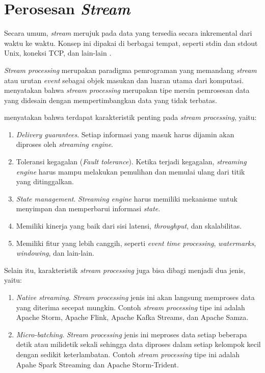 \section{Perosesan \textit{Stream}}

Secara umum, \textit{stream} merujuk pada data yang tersedia secara inkremental dari waktu ke waktu. Konsep ini dipakai di berbagai tempat, seperti stdin dan stdout Unix, koneksi TCP, dan lain-lain \parencite{dataIntensiveApplications}.

\textit{Stream processing} merupakan paradigma pemrograman yang memandang \textit{stream} atau urutan \textit{event} sebagai objek masukan dan luaran utama dari komputasi. \cite{streaming101} menyatakan bahwa \textit{stream processing} merupakan tipe mersin pemrosesan data yang didesain dengan mempertimbangkan data yang tidak terbatas.

\cite{streamProcessingComparison} menyatakan bahwa terdapat karakteristik penting pada \textit{stream processing}, yaitu:

\begin{enumerate}
    \item \textit{Delivery guarantees}. Setiap informasi yang masuk harus dijamin akan diproses oleh \textit{streaming engine}.
    \item Toleransi kegagalan (\textit{Fault tolerance}). Ketika terjadi kegagalan, \textit{streaming engine} harus mampu melakukan pemulihan dan memulai ulang dari titik yang ditinggalkan.
    \item \textit{State management}. \textit{Streaming engine} harus memiliki mekanisme untuk menyimpan dan memperbarui informasi \textit{state}.
    \item Memiliki kinerja yang baik dari sisi latensi, \textit{throughput}, dan skalabilitas.
    \item Memiliki fitur yang lebih canggih, seperti \textit{event time processing}, \textit{watermarks}, \textit{windowing}, dan lain-lain.
\end{enumerate}

Selain itu, karakteristik \textit{stream processing} juga bisa dibagi menjadi dua jenis, yaitu:

\begin{enumerate}
    \item \textit{Native streaming}. \textit{Stream processing} jenis ini akan langsung memproses data yang diterima secepat mungkin. Contoh \textit{stream processing} tipe ini adalah Apache Storm, Apache Flink, Apache Kafka Streams, dan Apache Samza.
    \item \textit{Micro-batching}. \textit{Stream processing} jenis ini meproses data setiap beberapa detik atau milidetik sekali sehingga data diproses dalam setiap kelompok kecil dengan sedikit keterlambatan. Contoh \textit{stream processing} tipe ini adalah Apahe Spark Streaming dan Apache Storm-Trident.
\end{enumerate}

